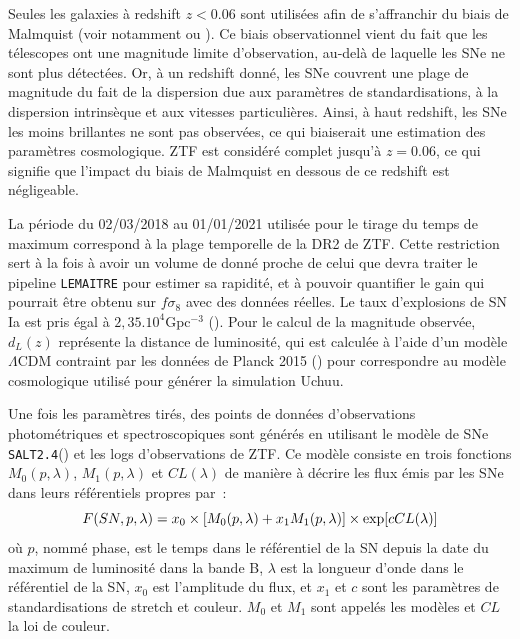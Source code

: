 \documentclass{book}
\def\lemaitre{\texttt{LEMAITRE}\xspace}
\def\saltd{\texttt{SALT2.4}\xspace}
\begin{document}
Seules les galaxies à redshift $z<0.06$ sont utilisées afin de s'affranchir du biais de Malmquist (voir notamment \cite{carreres_growth-rate_2023} ou \cite{boyd_accounting_2024}). Ce biais observationnel vient du fait que les télescopes ont une magnitude limite d'observation, au-delà de laquelle les SNe ne sont plus détectées. Or, à un redshift donné, les SNe couvrent une plage de magnitude du fait de la dispersion due aux paramètres de standardisations, à la dispersion intrinsèque et aux vitesses particulières. Ainsi, à haut redshift, les SNe les moins brillantes ne sont pas observées, ce qui biaiserait une estimation des paramètres cosmologique. ZTF est considéré complet jusqu'à $z=0.06$, ce qui signifie que l'impact du biais de Malmquist en dessous de ce redshift est négligeable.

La période du 02/03/2018 au 01/01/2021 utilisée pour le tirage du temps de maximum correspond à la plage temporelle de la DR2 de ZTF\cite{rigault_ztf_2024}. Cette restriction sert à la fois à avoir un volume de donné proche de celui que devra traiter le pipeline \lemaitre pour estimer sa rapidité, et à pouvoir quantifier le gain qui pourrait être obtenu sur $f\sigma_8$ avec des données réelles. Le taux d'explosions de SN Ia est pris égal à $2,35 .10^4$Gpc$^{-3}$ (\cite{perley_zwicky_2020}).
Pour le calcul de la magnitude observée, $d_L(z)$ représente la distance de luminosité, qui est calculée à l'aide d'un modèle $\Lambda$CDM contraint par les données de Planck 2015 (\cite{planck_collaboration_planck_2016}) pour correspondre au modèle cosmologique utilisé pour générer la simulation Uchuu.

Une fois les paramètres tirés, des points de données d'observations photométriques et spectroscopiques sont générés en utilisant le modèle de SNe \saltd (\cite{guy_salt2_2007, rigault_ztf_2024}) et les logs d'observations de ZTF. Ce modèle consiste en trois fonctions $M_0(p, \lambda)$, $M_1(p, \lambda)$ et $CL(\lambda)$ de manière à décrire les flux émis par les SNe dans leurs référentiels propres par~:
\begin{equation}
    F(SN, p, \lambda) = x_0 \times \qty[M_0(p, \lambda) + x_1 M_1(p, \lambda)] \times \exp[c CL(\lambda)]
\end{equation}
où $p$, nommé phase, est le temps dans le référentiel de la SN depuis la date du maximum de luminosité dans la bande B, $\lambda$ est la longueur d'onde dans le référentiel de la SN, $x_0$ est l'amplitude du flux, et $x_1$ et $c$ sont les paramètres de standardisations de stretch et couleur. $M_0$ et $M_1$ sont appelés les modèles et $CL$ la loi de couleur.
\end{document}
